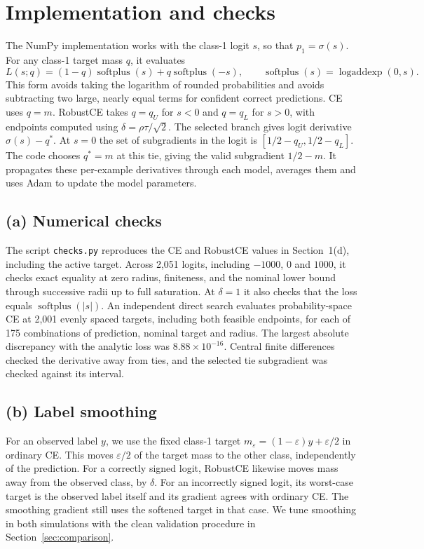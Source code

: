 \documentclass[11pt,a4paper]{article}
\begin{document}
\section{Implementation and checks}
The NumPy implementation works with the class-1 logit $s$, so that
$p_1=\sigma(s)$. For any class-1 target mass $q$, it evaluates
\begin{equation}
    L(s;q)=(1-q)\operatorname{softplus}(s)+q\operatorname{softplus}(-s),
    \qquad \operatorname{softplus}(s)=\operatorname{logaddexp}(0,s).
\end{equation}
This form avoids taking the logarithm of rounded probabilities and avoids
subtracting two large, nearly equal terms for confident correct predictions.
CE uses $q=m$. RobustCE takes $q=q_U$ for $s<0$ and $q=q_L$ for $s>0$,
with endpoints computed using $\delta=\rho\tau/\sqrt{2}$. The selected
branch gives logit derivative $\sigma(s)-q^*$. At $s=0$ the set of
subgradients in the logit is $[1/2-q_U,1/2-q_L]$. The code chooses $q^*=m$
at this tie, giving the valid subgradient $1/2-m$. It propagates these
per-example derivatives through each model, averages them and uses Adam to
update the model parameters.

\subsection*{(a) Numerical checks}
The script \texttt{checks.py} reproduces the CE and RobustCE values in
Section~1(d), including the active target. Across 2,051 logits, including
$-1000$, $0$ and $1000$, it checks exact equality at zero radius, finiteness,
and the nominal lower bound through successive radii up to full saturation.
At $\delta=1$ it also checks that the loss equals
$\operatorname{softplus}(|s|)$. An independent direct search evaluates
probability-space CE at 2,001 evenly spaced targets, including both feasible
endpoints, for each of 175 combinations of prediction, nominal target and
radius. The largest absolute discrepancy with the analytic loss was
$8.88\times10^{-16}$. Central finite differences checked the derivative away
from ties, and the selected tie subgradient was checked against its interval.

\subsection*{(b) Label smoothing}
For an observed label $y$, we use the fixed class-1 target
$m_\varepsilon=(1-\varepsilon)y+\varepsilon/2$ in ordinary CE. This moves
$\varepsilon/2$ of the target mass to the other class, independently of the
prediction. For a correctly signed logit, RobustCE likewise moves mass away
from the observed class, by $\delta$. For an incorrectly signed logit, its
worst-case target is the observed label itself and its gradient agrees with
ordinary CE. The smoothing gradient still uses the softened target in that
case. We tune smoothing in both simulations with the clean validation procedure
in Section~\ref{sec:comparison}.
\end{document}
